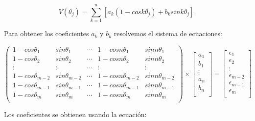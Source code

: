 \documentclass[12pt,letterpaper]{article}
\begin{document}
\begin{center}
 \begin{equation}
 V(\theta_j)=\sum_{k=1}^{n} [a_k (1-cos k \theta_j) + b_k sin k \theta_j].
 \end{equation}

\end{center}

Para obtener los coeficientes $a_k$ y $b_k$ resolvemos el sistema de ecuaciones:
\begin{center}
 \[\left(\begin{array}{ccccc}
  1-cos  \theta_1 & sin \theta_1 & \cdots & 1-cos n\theta_1 & sin n\theta_1\\
  1-cos \theta_2 & sin \theta_2 & \cdots & 1-cos n\theta_2 & sin n\theta_2\\
  \vdots & \vdots & \cdots & \vdots & \vdots \\
  1-cos \theta_{m-2} & sin \theta_{m-2} & \cdots & 1-cos n\theta_{m-2} & sin  n\theta_{m-2}\\
  1-cos  \theta_{m-1} & sin  \theta_{m-1}  & \cdots & 1-cos  n\theta_{m-1} & sin  n\theta_{m-1}\\
  1-cos  \theta_m & sin  \theta_m & \cdots & 1-cos  n\theta_m & sin  n\theta_m\\
 \end{array} \right) \times \left[\begin{array}{c}
            a_1\\
            b_1\\
            \vdots \\
            a_n\\
            b_n\\
           \end{array} \right] = \left[ \begin{array}{c}
            \epsilon_1\\
            \epsilon_2\\
            \vdots \\
            \epsilon_{m-2}\\
            \epsilon_{m-1}\\
            \epsilon_m\\
            
                                \end{array} \right] \]


\end{center}

Los coeficientes se obtienen usando la ecuación:
\end{document}
